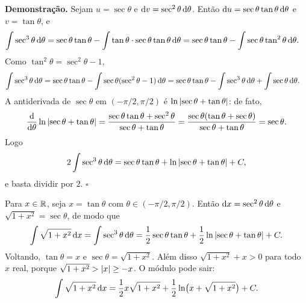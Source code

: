 \documentclass[11pt,a4paper]{article}
\begin{document}
\noindent\textbf{Demonstração.}
Sejam \(u=\sec\theta\) e \(\mathrm{d} v=\sec^{2}\theta\,\mathrm{d}\theta\). Então \(\mathrm{d} u=\sec\theta\tan\theta\,\mathrm{d}\theta\) e \(v=\tan\theta\), e
\begin{align*}
\int\sec^{3}\theta\,\mathrm{d}\theta
&=\sec\theta\tan\theta-\int\tan\theta\cdot\sec\theta\tan\theta\,\mathrm{d}\theta
=\sec\theta\tan\theta-\int\sec\theta\tan^{2}\theta\,\mathrm{d}\theta.
\end{align*}
Como \(\tan^{2}\theta=\sec^{2}\theta-1\),
\begin{align*}
\int\sec^{3}\theta\,\mathrm{d}\theta
&=\sec\theta\tan\theta-\int\sec\theta(\sec^{2}\theta-1)\,\mathrm{d}\theta
=\sec\theta\tan\theta-\int\sec^{3}\theta\,\mathrm{d}\theta+\int\sec\theta\,\mathrm{d}\theta.
\end{align*}
A antiderivada de \(\sec\theta\) em \((-\pi/2,\pi/2)\) é \(\ln\left\lvert \sec\theta+\tan\theta \right\rvert\): de fato,
\[
\frac{\mathrm{d}}{\mathrm{d}\theta}\ln\left\lvert \sec\theta+\tan\theta \right\rvert
=\frac{\sec\theta\tan\theta+\sec^{2}\theta}{\sec\theta+\tan\theta}
=\frac{\sec\theta(\tan\theta+\sec\theta)}{\sec\theta+\tan\theta}
=\sec\theta.
\]
Logo
\[
2\int\sec^{3}\theta\,\mathrm{d}\theta
=\sec\theta\tan\theta+\ln\left\lvert \sec\theta+\tan\theta \right\rvert+C,
\]
e basta dividir por \(2\).
\hfill\(\square\)

\begin{exemplo}[Família \(\sqrt{a^{2}+x^{2}}\), com \(a=1\)]
Para \(x\in\mathbb{R}\), seja \(x=\tan\theta\) com \(\theta\in(-\pi/2,\pi/2)\). Então \(\mathrm{d} x=\sec^{2}\theta\,\mathrm{d}\theta\) e \(\sqrt{1+x^{2}}=\sec\theta\), de modo que
\[
\int\sqrt{1+x^{2}}\,\mathrm{d} x
=\int\sec^{3}\theta\,\mathrm{d}\theta
=\frac12\sec\theta\tan\theta+\frac12\ln\left\lvert \sec\theta+\tan\theta \right\rvert+C.
\]
Voltando, \(\tan\theta=x\) e \(\sec\theta=\sqrt{1+x^{2}}\). Além disso \(\sqrt{1+x^{2}}+x>0\) para todo \(x\) real, porque \(\sqrt{1+x^{2}}>\left\lvert x \right\rvert\ge -x\). O módulo pode sair:
\[
\int\sqrt{1+x^{2}}\,\mathrm{d} x
=\frac12 x\sqrt{1+x^{2}}+\frac12\ln\bigl(x+\sqrt{1+x^{2}}\bigr)+C.
\]
\end{exemplo}
\end{document}
